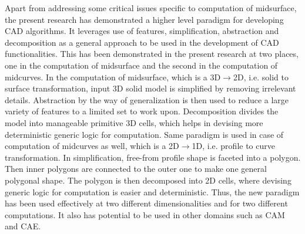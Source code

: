\begin{enumerate}
Apart from addressing some critical issues specific to computation of midsurface, the present research has demonstrated a higher level paradigm for developing CAD algorithms. It leverages use of features, simplification, abstraction and decomposition as a general approach to be used in the development of CAD functionalities. This has been demonstrated in the present research at two places, one in the computation of midsurface and the second in the computation of midcurves. In the computation of midsurface, which is a 3D$\rightarrow$2D, i.e. solid to surface transformation, input 3D solid model is simplified by removing irrelevant details. Abstraction by the way of generalization is then used to reduce a large variety of features to a limited set to work upon. Decomposition divides the model into manageable primitive 3D cells, which helps in devising more deterministic generic logic for computation. Same paradigm is used in case of computation of midcurves as well, which is a 2D$\rightarrow$1D, i.e. profile to curve transformation. In simplification, free-from profile shape is faceted into a polygon. Then inner polygons are connected to the outer one to make one general polygonal shape. The polygon is then decomposed into 2D cells, where devising generic logic for computation is easier and deterministic. Thus, the new paradigm has been used effectively at two different dimensionalities and for two different computations. It also has potential to be used in other domains such as CAM and CAE.

\end{enumerate}
